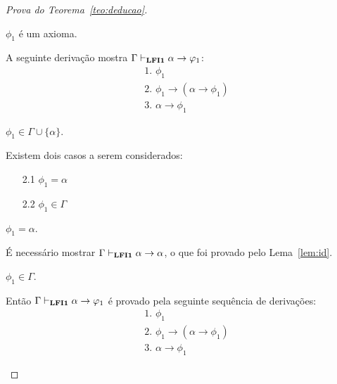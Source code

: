 \begin{proof}[Prova do Teorema~\ref{teo:deducao}]
        \begin{provaporcasos}
            \casodeprova{} $\phi_{1}$ é um axioma. 
            
                A seguinte derivação mostra $\Gamma \vdash_{\textbf{LFI1}{}} \alpha \to \varphi_{1}$:
                \begin{align*}
                    & \text{1. } \phi_{1} \tag{Axioma}\\
                    & \text{2. } \phi_{1} \to (\alpha \to \phi_{1}) \tag{Ax1}\\
                    & \text{3. } \alpha \to \phi_{1} \tag{MP 1,2}
                \end{align*}

                \casodeprova{} $\phi_{1} \in \Gamma \cup \{\alpha\}$. 
                
                Existem dois casos a serem considerados:

                \begin{enumerate}
                    \item[2.1] $\phi_{1} = \alpha$
                    \item[2.2] $\phi_{1} \in \Gamma$
                \end{enumerate}

                \begin{provaporsubcasos}
                    \subcasodeprova{} $\phi_{1} = \alpha$. 
                    
                        É necessário mostrar $\Gamma \vdash_{\textbf{LFI1}{}} \alpha \to \alpha$, o que foi provado pelo Lema~\ref{lem:id}.

                    \subcasodeprova{} $\phi_{1} \in \Gamma$.
                    
                        Então $\Gamma \vdash_{\textbf{LFI1}{}} \alpha \to \varphi_{1}$ é provado pela seguinte sequência de derivações:
                        \begin{align*}
                            & \text{1. } \phi_{1} \tag{Premissa}\\
                            & \text{2. } \phi_{1} \to (\alpha \to \phi_{1}) \tag{Ax1}\\
                            & \text{3. } \alpha \to \phi_{1} \tag{MP 1, 2}
                        \end{align*}
                \end{provaporsubcasos}
                
            \end{provaporcasos}
            

\end{proof}
